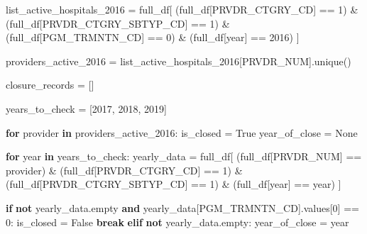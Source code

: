 \documentclass[
  letterpaper,
  DIV=11,
  numbers=noendperiod]{scrartcl}
\newenvironment{Shaded}{\begin{snugshade}}{\end{snugshade}}
\newcommand{\ControlFlowTok}[1]{\textcolor[rgb]{0.00,0.23,0.31}{\textbf{#1}}}
\newcommand{\DecValTok}[1]{\textcolor[rgb]{0.68,0.00,0.00}{#1}}
\newcommand{\KeywordTok}[1]{\textcolor[rgb]{0.00,0.23,0.31}{\textbf{#1}}}
\newcommand{\NormalTok}[1]{\textcolor[rgb]{0.00,0.23,0.31}{#1}}
\newcommand{\OperatorTok}[1]{\textcolor[rgb]{0.37,0.37,0.37}{#1}}
\newcommand{\StringTok}[1]{\textcolor[rgb]{0.13,0.47,0.30}{#1}}
\newcommand{\VariableTok}[1]{\textcolor[rgb]{0.07,0.07,0.07}{#1}}
\begin{document}
\begin{Shaded}
\begin{Highlighting}[]
\NormalTok{list\_active\_hospitals\_2016 }\OperatorTok{=}\NormalTok{ full\_df[}
\NormalTok{    (full\_df[}\StringTok{\textquotesingle{}PRVDR\_CTGRY\_CD\textquotesingle{}}\NormalTok{] }\OperatorTok{==} \DecValTok{1}\NormalTok{) }\OperatorTok{\&} 
\NormalTok{    (full\_df[}\StringTok{\textquotesingle{}PRVDR\_CTGRY\_SBTYP\_CD\textquotesingle{}}\NormalTok{] }\OperatorTok{==} \DecValTok{1}\NormalTok{) }\OperatorTok{\&} 
\NormalTok{    (full\_df[}\StringTok{\textquotesingle{}PGM\_TRMNTN\_CD\textquotesingle{}}\NormalTok{] }\OperatorTok{==} \DecValTok{0}\NormalTok{) }\OperatorTok{\&} 
\NormalTok{    (full\_df[}\StringTok{\textquotesingle{}year\textquotesingle{}}\NormalTok{] }\OperatorTok{==} \DecValTok{2016}\NormalTok{)}
\NormalTok{]}

\NormalTok{providers\_active\_2016 }\OperatorTok{=}\NormalTok{ list\_active\_hospitals\_2016[}\StringTok{\textquotesingle{}PRVDR\_NUM\textquotesingle{}}\NormalTok{].unique()}

\NormalTok{closure\_records }\OperatorTok{=}\NormalTok{ []}

\NormalTok{years\_to\_check }\OperatorTok{=}\NormalTok{ [}\DecValTok{2017}\NormalTok{, }\DecValTok{2018}\NormalTok{, }\DecValTok{2019}\NormalTok{]}

\ControlFlowTok{for}\NormalTok{ provider }\KeywordTok{in}\NormalTok{ providers\_active\_2016:}
\NormalTok{    is\_closed }\OperatorTok{=} \VariableTok{True}
\NormalTok{    year\_of\_close }\OperatorTok{=} \VariableTok{None}
    
    \ControlFlowTok{for}\NormalTok{ year }\KeywordTok{in}\NormalTok{ years\_to\_check:}
\NormalTok{        yearly\_data }\OperatorTok{=}\NormalTok{ full\_df[}
\NormalTok{            (full\_df[}\StringTok{\textquotesingle{}PRVDR\_NUM\textquotesingle{}}\NormalTok{] }\OperatorTok{==}\NormalTok{ provider) }\OperatorTok{\&} 
\NormalTok{            (full\_df[}\StringTok{\textquotesingle{}PRVDR\_CTGRY\_CD\textquotesingle{}}\NormalTok{] }\OperatorTok{==} \DecValTok{1}\NormalTok{) }\OperatorTok{\&} 
\NormalTok{            (full\_df[}\StringTok{\textquotesingle{}PRVDR\_CTGRY\_SBTYP\_CD\textquotesingle{}}\NormalTok{] }\OperatorTok{==} \DecValTok{1}\NormalTok{) }\OperatorTok{\&} 
\NormalTok{            (full\_df[}\StringTok{\textquotesingle{}year\textquotesingle{}}\NormalTok{] }\OperatorTok{==}\NormalTok{ year)}
\NormalTok{        ]}
        
        \ControlFlowTok{if} \KeywordTok{not}\NormalTok{ yearly\_data.empty }\KeywordTok{and}\NormalTok{ yearly\_data[}\StringTok{\textquotesingle{}PGM\_TRMNTN\_CD\textquotesingle{}}\NormalTok{].values[}\DecValTok{0}\NormalTok{] }\OperatorTok{==} \DecValTok{0}\NormalTok{:}
\NormalTok{            is\_closed }\OperatorTok{=} \VariableTok{False}
            \ControlFlowTok{break}
        \ControlFlowTok{elif} \KeywordTok{not}\NormalTok{ yearly\_data.empty:}
\NormalTok{            year\_of\_close }\OperatorTok{=}\NormalTok{ year}
    

\end{Highlighting}
\end{Shaded}
\end{document}
